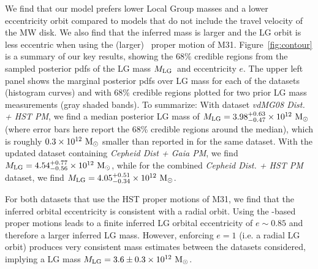 \documentclass[twocolumn]{aastex631}
\newcommand{\mlg}{\ensuremath{M_{\rm LG}}}
\begin{document}
We find that our model prefers lower Local Group masses and a lower eccentricity
orbit compared to models that do not include the travel velocity of the MW disk.
We also find that the inferred mass is larger and the LG orbit is less eccentric
when using the (larger) \gaia\ proper motion of M31.
Figure~\ref{fig:contour} is a summary of our key results, showing the 68\%
credible regions from the sampled posterior pdfs of the LG mass \mlg\ and
eccentricity $e$.
The upper left panel shows the marginal posterior pdfs over LG mass for each of
the datasets (histogram curves) and with 68\% credible regions plotted for two
prior LG mass measurements (gray shaded bands).
To summarize: With dataset \textit{vdMG08 Dist. + HST PM}, we find a
median posterior LG mass of $\mlg = 3.98 ^{+0.63}_{-0.47}\times10^{12}~\Msun$ 
(where error
bars here report the 68\% credible regions around the median), which is
roughly $0.3\times 10^{12}~\mathrm{M}_\odot$ smaller than reported in \cite{vdm2012} for
the same dataset.
With the updated dataset containing \textit{Cepheid Dist + Gaia PM}, we find
$\mlg = 4.54 ^{+0.77}_{-0.56}\times10^{12}~\Msun$, while for the combined
 \textit{Cepheid Dist. + HST PM} dataset, we find 
 $\mlg = 4.05^{+0.51}_{-0.34}\times 10^{12}~\Msun$.

For both datasets that use the HST proper motions of M31, we
find that the inferred orbital eccentricity is consistent with a radial orbit.
Using the \gaia-based proper motions \citep{Salomon2021} leads to a finite
inferred LG orbital eccentricity of $e\sim 0.85$ and therefore a larger inferred
LG mass.
However, enforcing $e=1$ (i.e. a radial LG orbit) produces very consistent mass
estimates between the datasets considered, implying a LG mass $\mlg = 3.6
\pm 0.3 \times 10^{12}~\Msun$.
\end{document}
